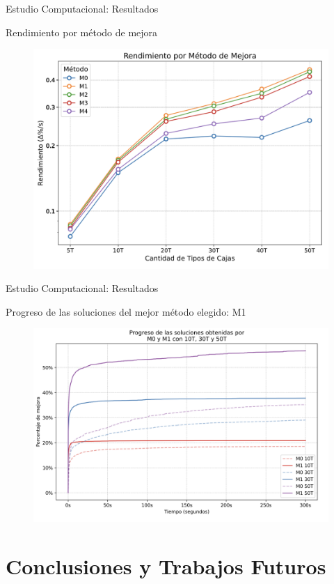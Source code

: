 \documentclass[handout]{beamer}
\begin{document}
\begin{frame}{Estudio Computacional: Resultados}
    \begin{exampleblock}{Rendimiento por método de mejora}
        \begin{figure}
            \centering
            \includegraphics[width=0.8\linewidth]{pic/exp-rendimiento.png}
        \end{figure}
    \end{exampleblock}
\end{frame}

\begin{frame}{Estudio Computacional: Resultados}
    \begin{exampleblock}{Progreso de las soluciones del mejor método elegido: M1}
        \begin{figure}
            \centering
            \includegraphics[width=0.8\linewidth]{pic/exp-progreso-soluciones.png}
        \end{figure}
    \end{exampleblock}
\end{frame}

\section[Conclusiones]{Conclusiones y Trabajos Futuros}
\end{document}
